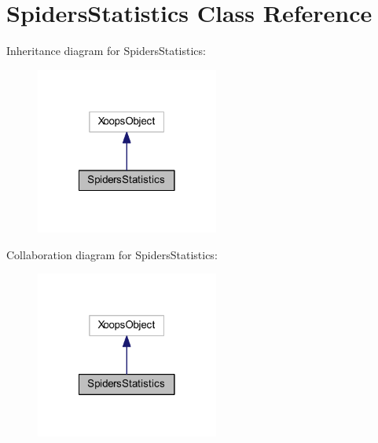\hypertarget{class_spiders_statistics}{\section{Spiders\-Statistics Class Reference}
\label{class_spiders_statistics}
}


Inheritance diagram for Spiders\-Statistics\-:
\nopagebreak
\begin{figure}[H]
\begin{center}
\leavevmode
\includegraphics[width=170pt]{class_spiders_statistics__inherit__graph}
\end{center}
\end{figure}


Collaboration diagram for Spiders\-Statistics\-:
\nopagebreak
\begin{figure}[H]
\begin{center}
\leavevmode
\includegraphics[width=170pt]{class_spiders_statistics__coll__graph}
\end{center}
\end{figure}
